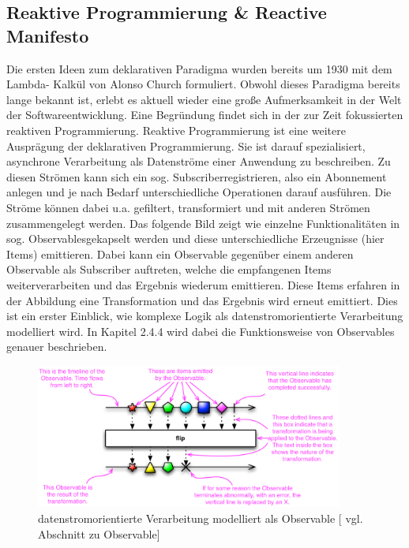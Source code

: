 \documentclass[12pt,oneside,a4paper,bibtotoc,liststotoc]{scrreprt}
\begin{document}
\subsection{Reaktive Programmierung \& Reactive Manifesto}
Die ersten Ideen zum deklarativen Paradigma wurden bereits um 1930 mit dem Lambda- Kalkül von Alonso Church formuliert. Obwohl dieses Paradigma bereits lange bekannt ist, erlebt es aktuell wieder eine große Aufmerksamkeit in der Welt der Softwareentwicklung. Eine Begründung findet sich in der zur Zeit fokussierten reaktiven Programmierung. Reaktive Programmierung ist eine weitere Ausprägung der deklarativen Programmierung. Sie ist darauf spezialisiert, asynchrone Verarbeitung als Datenströme einer Anwendung zu beschreiben. Zu diesen Strömen kann sich ein sog. \glqq Subscriber\grqq  registrieren, also ein Abonnement anlegen und je nach Bedarf unterschiedliche Operationen darauf ausführen. Die Ströme können dabei u.a. gefiltert, transformiert und mit anderen Strömen zusammengelegt werden. Das folgende Bild zeigt wie einzelne Funktionalitäten in sog. \glqq Observables\grqq gekapselt werden und diese unterschiedliche Erzeugnisse (hier Items) emittieren. Dabei kann ein Observable gegenüber einem anderen Observable als Subscriber auftreten, welche die empfangenen Items weiterverarbeiten und das Ergebnis wiederum emittieren. Diese Items erfahren in der Abbildung eine Transformation und das Ergebnis wird erneut emittiert. Dies ist ein erster Einblick, wie komplexe Logik als datenstromorientierte Verarbeitung modelliert wird. In Kapitel 2.4.4 wird dabei die Funktionsweise von Observables genauer beschrieben.
\begin{figure}[H]
  \begin{centering}
    \includegraphics[width=0.9\textwidth]{img/Observable.png}
    \caption{datenstromorientierte Verarbeitung modelliert als Observable [\citet {rxAllgDoku} vgl. Abschnitt zu Observable] }
    \label{Observable}
  \end{centering}
\end{figure}
\end{document}
